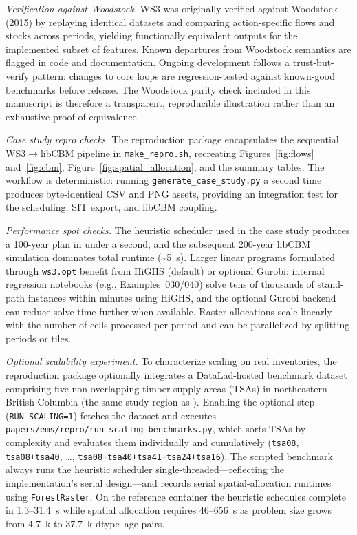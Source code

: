 \documentclass[review]{elsarticle}
\begin{document}
\emph{Verification against Woodstock.} WS3 was originally verified against Woodstock (2015) by replaying identical datasets and comparing action-specific flows and stocks across periods, yielding functionally equivalent outputs for the implemented subset of features. Known departures from Woodstock semantics are flagged in code and documentation. Ongoing development follows a trust-but-verify pattern: changes to core loops are regression-tested against known-good benchmarks before release. The Woodstock parity check included in this manuscript is therefore a transparent, reproducible illustration rather than an exhaustive proof of equivalence.

\emph{Case study repro checks.} The reproduction package encapsulates the sequential WS3$\to$libCBM pipeline in \texttt{make\_repro.sh}, recreating Figures~\ref{fig:flows} and~\ref{fig:cbm}, Figure~\ref{fig:spatial_allocation}, and the summary tables. The workflow is deterministic: running \texttt{generate\_case\_study.py} a second time produces byte-identical CSV and PNG assets, providing an integration test for the scheduling, SIT export, and libCBM coupling.

\emph{Performance spot checks.} The heuristic scheduler used in the case study produces a 100-year plan in under a second, and the subsequent 200-year libCBM simulation dominates total runtime (\textasciitilde5~s). Larger linear programs formulated through \texttt{ws3.opt} benefit from HiGHS (default) or optional Gurobi: internal regression notebooks (e.g., Examples~030/040) solve tens of thousands of stand-path instances within minutes using HiGHS, and the optional Gurobi backend can reduce solve time further when available. Raster allocations scale linearly with the number of cells processed per period and can be parallelized by splitting periods or tiles.

\emph{Optional scalability experiment.} To characterize scaling on real inventories, the reproduction package optionally integrates a DataLad-hosted benchmark dataset comprising five non-overlapping timber supply areas (TSAs) in northeastern British Columbia (the same study region as \citealt{boisvenue2022managing}). Enabling the optional step (\texttt{RUN\_SCALING=1}) fetches the dataset and executes \texttt{papers/ems/repro/run\_scaling\_benchmarks.py}, which sorts TSAs by complexity and evaluates them individually and cumulatively (\texttt{tsa08}, \texttt{tsa08+tsa40}, \ldots, \texttt{tsa08+tsa40+tsa41+tsa24+tsa16}). The scripted benchmark always runs the heuristic scheduler single-threaded---reflecting the implementation's serial design---and records serial spatial-allocation runtimes using \texttt{ForestRaster}. On the reference container the heuristic schedules complete in 1.3--31.4~s while spatial allocation requires 46--656~s as problem size grows from 4.7~k to 37.7~k dtype--age pairs.
\end{document}
